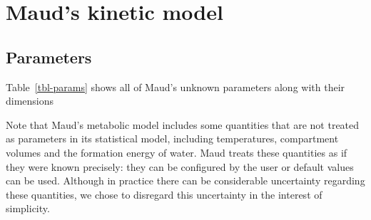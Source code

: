 \documentclass[journal=asbcd6,manuscript=article,layout=traditional]{achemso}
\begin{document}
\hypertarget{mauds-kinetic-model}{%
\section{Maud's kinetic model}\label{mauds-kinetic-model}}

\hypertarget{parameters}{%
\subsection{Parameters}\label{parameters}}

Table~\ref{tbl-params} shows all of Maud's unknown parameters along with
their dimensions

Note that Maud's metabolic model includes some quantities that are not
treated as parameters in its statistical model, including temperatures,
compartment volumes and the formation energy of water. Maud treats these
quantities as if they were known precisely: they can be configured by
the user or default values can be used. Although in practice there can
be considerable uncertainty regarding these quantities, we chose to
disregard this uncertainty in the interest of simplicity.
\end{document}
